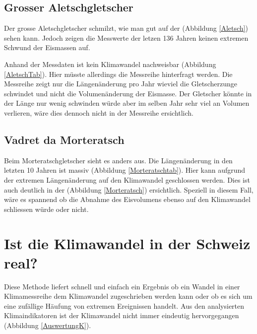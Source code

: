\begin{refsection}
\subsection{Grosser Aletschgletscher}
Der grosse Aletschgletscher schmilzt, wie man gut auf der (Abbildung \ref{Aletsch}) sehen kann. Jedoch zeigen die Messwerte der letzen 136 Jahren keinen extremen Schwund der Eismassen auf.

Anhand der Messdaten ist kein Klimawandel nachweisbar (Abbildung \ref{AletschTab}). Hier müsste allerdings die Messreihe hinterfragt werden. Die Messreihe zeigt nur die Längenänderung pro Jahr wieviel die Gletscherzunge schwindet und nicht die Volumenänderung der Eismasse. Der Gletscher könnte in der Länge nur wenig schwinden würde aber im selben Jahr sehr viel an Volumen verlieren, wäre dies dennoch nicht in der Messreihe ersichtlich.


\subsection{Vadret da Morteratsch}
Beim Morteratschgletscher sieht es anders aus. Die Längenänderung in den letzten 10 Jahren ist massiv (Abbildung \ref{Morteratschtab}). Hier kann aufgrund der extremen Längenänderung auf den Klimawandel geschlossen werden. Dies ist auch deutlich in der (Abbildung \ref{Morteratsch}) ersichtlich. Speziell in diesem Fall, wäre es spannend ob die Abnahme des Eisvolumens ebenso auf den Klimawandel schliessen würde oder nicht.





\section{Ist die Klimawandel in der Schweiz real?}
Diese Methode liefert schnell und einfach ein Ergebnis ob ein Wandel in einer Klimamessreihe dem Klimawandel zugeschrieben werden kann oder ob es sich um eine zufällige Häufung von extremen Ereignissen handelt. Aus den analysierten Klimaindikatoren ist der Klimawandel nicht immer eindeutig hervorgegangen (Abbildung \ref{AuswertungK}). 


\end{refsection}
